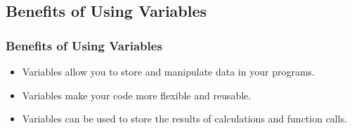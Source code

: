 \subsection{Benefits of Using Variables}
\begin{frame}
\frametitle{Benefits of Using Variables}
\begin{itemize}
    \item Variables allow you to store and manipulate data in your programs.
    \item Variables make your code more flexible and reusable.
    \item Variables can be used to store the results of calculations and function calls.
\end{itemize}
\end{frame}
